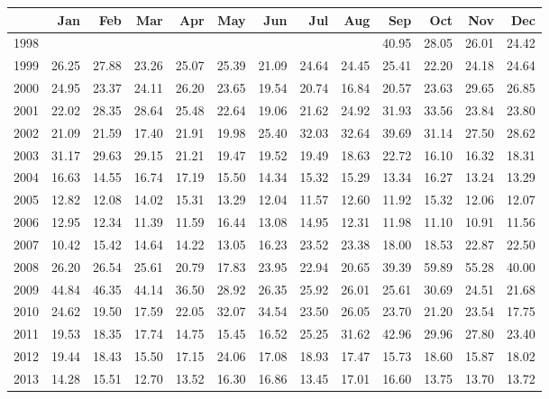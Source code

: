 \begin{longtable}{rrrrrrrrrrrrr}
  \hline
 & Jan & Feb & Mar & Apr & May & Jun & Jul & Aug & Sep & Oct & Nov & Dec \\ 
  \hline
1998 &  &  &  &  &  &  &  &  & 40.95 & 28.05 & 26.01 & 24.42 \\ 
  1999 & 26.25 & 27.88 & 23.26 & 25.07 & 25.39 & 21.09 & 24.64 & 24.45 & 25.41 & 22.20 & 24.18 & 24.64 \\ 
  2000 & 24.95 & 23.37 & 24.11 & 26.20 & 23.65 & 19.54 & 20.74 & 16.84 & 20.57 & 23.63 & 29.65 & 26.85 \\ 
  2001 & 22.02 & 28.35 & 28.64 & 25.48 & 22.64 & 19.06 & 21.62 & 24.92 & 31.93 & 33.56 & 23.84 & 23.80 \\ 
  2002 & 21.09 & 21.59 & 17.40 & 21.91 & 19.98 & 25.40 & 32.03 & 32.64 & 39.69 & 31.14 & 27.50 & 28.62 \\ 
  2003 & 31.17 & 29.63 & 29.15 & 21.21 & 19.47 & 19.52 & 19.49 & 18.63 & 22.72 & 16.10 & 16.32 & 18.31 \\ 
  2004 & 16.63 & 14.55 & 16.74 & 17.19 & 15.50 & 14.34 & 15.32 & 15.29 & 13.34 & 16.27 & 13.24 & 13.29 \\ 
  2005 & 12.82 & 12.08 & 14.02 & 15.31 & 13.29 & 12.04 & 11.57 & 12.60 & 11.92 & 15.32 & 12.06 & 12.07 \\ 
  2006 & 12.95 & 12.34 & 11.39 & 11.59 & 16.44 & 13.08 & 14.95 & 12.31 & 11.98 & 11.10 & 10.91 & 11.56 \\ 
  2007 & 10.42 & 15.42 & 14.64 & 14.22 & 13.05 & 16.23 & 23.52 & 23.38 & 18.00 & 18.53 & 22.87 & 22.50 \\ 
  2008 & 26.20 & 26.54 & 25.61 & 20.79 & 17.83 & 23.95 & 22.94 & 20.65 & 39.39 & 59.89 & 55.28 & 40.00 \\ 
  2009 & 44.84 & 46.35 & 44.14 & 36.50 & 28.92 & 26.35 & 25.92 & 26.01 & 25.61 & 30.69 & 24.51 & 21.68 \\ 
  2010 & 24.62 & 19.50 & 17.59 & 22.05 & 32.07 & 34.54 & 23.50 & 26.05 & 23.70 & 21.20 & 23.54 & 17.75 \\ 
  2011 & 19.53 & 18.35 & 17.74 & 14.75 & 15.45 & 16.52 & 25.25 & 31.62 & 42.96 & 29.96 & 27.80 & 23.40 \\ 
  2012 & 19.44 & 18.43 & 15.50 & 17.15 & 24.06 & 17.08 & 18.93 & 17.47 & 15.73 & 18.60 & 15.87 & 18.02 \\ 
  2013 & 14.28 & 15.51 & 12.70 & 13.52 & 16.30 & 16.86 & 13.45 & 17.01 & 16.60 & 13.75 & 13.70 & 13.72 \\ 

\end{longtable}
